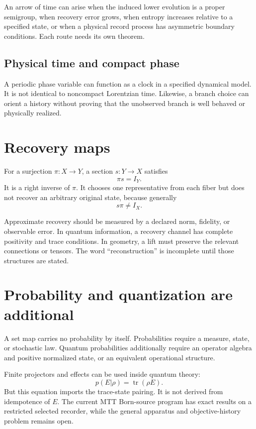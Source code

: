 \documentclass[11pt]{article}
\begin{document}
An arrow of time can arise when the induced lower evolution is a proper
semigroup, when recovery error grows, when entropy increases relative to a
specified state, or when a physical record process has asymmetric boundary
conditions. Each route needs its own theorem.

\subsection{Physical time and compact phase}

A periodic phase variable can function as a clock in a specified dynamical
model. It is not identical to noncompact Lorentzian time. Likewise, a branch
choice can orient a history without proving that the unobserved branch is
well behaved or physically realized.

\section{Recovery maps}

For a surjection \(\pi:X\to Y\), a section \(s:Y\to X\) satisfies
\[
 \pi s=I_Y.
\]
It is a right inverse of \(\pi\). It chooses one representative from each
fiber but does not recover an arbitrary original state, because generally
\[
 s\pi\neq I_X.
\]

Approximate recovery should be measured by a declared norm, fidelity, or
observable error. In quantum information, a recovery channel has complete
positivity and trace conditions. In geometry, a lift must preserve the
relevant connections or tensors. The word ``reconstruction'' is incomplete
until those structures are stated.

\section{Probability and quantization are additional}

A set map carries no probability by itself. Probabilities require a measure,
state, or stochastic law. Quantum probabilities additionally require an
operator algebra and positive normalized state, or an equivalent
operational structure.

Finite projectors and effects can be used inside quantum theory:
\[
 p(E|\rho)=\operatorname{tr}(\rho E).
\]
But this equation imports the trace-state pairing. It is not derived from
idempotence of \(E\). The current MTT Born-source program has exact results
on a restricted selected recorder, while the general apparatus and
objective-history problem remains open.
\end{document}
